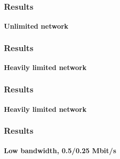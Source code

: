 
\begin{frame}

    \frametitle{Results}
    \framesubtitle{Unlimited network}

    \begin{overprint}
        \uncover<+->{}
    \end{overprint}

\end{frame}


\begin{frame}

    \frametitle{Results}
    \framesubtitle{Heavily limited network}

    \begin{overprint}
        \uncover<+->{}
    \end{overprint}

\end{frame}

\begin{frame}

    \frametitle{Results}
    \framesubtitle{Heavily limited network}

    \begin{overprint}
        \uncover<+->{}
    \end{overprint}

\end{frame}


\begin{frame}

    \frametitle{Results}
    \framesubtitle{Low bandwidth, 0.5/0.25 Mbit/s}

    \begin{overprint}
        \uncover<+->{}
    \end{overprint}

\end{frame}

